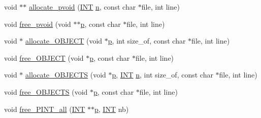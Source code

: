 \begin{DoxyCompactItemize}
void $\ast$$\ast$ \mbox{\hyperlink{_g_a_l_o_i_s_2memory_8_c_a0b121faaf69ba87cd8656f41c9ae8cc0}{allocate\+\_\+pvoid}} (\mbox{\hyperlink{galois_8h_a09fddde158a3a20bd2dcadb609de11dc}{I\+NT}} \mbox{\hyperlink{simeon_8_c_a7f2cd26777ce0ff3fdaf8d02aacbddfb}{n}}, const char $\ast$file, int line)
\item 
void \mbox{\hyperlink{_g_a_l_o_i_s_2memory_8_c_a7b1d5340753be7cd30403b104044ffe8}{free\+\_\+pvoid}} (void $\ast$$\ast$\mbox{\hyperlink{alphabet2_8_c_a533391314665d6bf1b5575e9a9cd8552}{p}}, const char $\ast$file, int line)
\item 
void $\ast$ \mbox{\hyperlink{_g_a_l_o_i_s_2memory_8_c_a5efd352b66c5bd5cd9eb5d233b803e15}{allocate\+\_\+\+O\+B\+J\+E\+CT}} (void $\ast$\mbox{\hyperlink{alphabet2_8_c_a533391314665d6bf1b5575e9a9cd8552}{p}}, int size\+\_\+of, const char $\ast$file, int line)
\item 
void \mbox{\hyperlink{_g_a_l_o_i_s_2memory_8_c_a94d06da57238d064c9424eed8078741a}{free\+\_\+\+O\+B\+J\+E\+CT}} (void $\ast$\mbox{\hyperlink{alphabet2_8_c_a533391314665d6bf1b5575e9a9cd8552}{p}}, const char $\ast$file, int line)
\item 
void $\ast$ \mbox{\hyperlink{_g_a_l_o_i_s_2memory_8_c_af5314236ae007b44933b88f9214b031c}{allocate\+\_\+\+O\+B\+J\+E\+C\+TS}} (void $\ast$\mbox{\hyperlink{alphabet2_8_c_a533391314665d6bf1b5575e9a9cd8552}{p}}, \mbox{\hyperlink{galois_8h_a09fddde158a3a20bd2dcadb609de11dc}{I\+NT}} \mbox{\hyperlink{simeon_8_c_a7f2cd26777ce0ff3fdaf8d02aacbddfb}{n}}, int size\+\_\+of, const char $\ast$file, int line)
\item 
void \mbox{\hyperlink{_g_a_l_o_i_s_2memory_8_c_a30bdb071eeac5e5b5719cf30d9596f8d}{free\+\_\+\+O\+B\+J\+E\+C\+TS}} (void $\ast$\mbox{\hyperlink{alphabet2_8_c_a533391314665d6bf1b5575e9a9cd8552}{p}}, const char $\ast$file, int line)
\item 
void \mbox{\hyperlink{_g_a_l_o_i_s_2memory_8_c_a8c74577588c4d669d8858633dd2f0b98}{free\+\_\+\+P\+I\+N\+T\+\_\+all}} (\mbox{\hyperlink{galois_8h_a09fddde158a3a20bd2dcadb609de11dc}{I\+NT}} $\ast$$\ast$\mbox{\hyperlink{alphabet2_8_c_a533391314665d6bf1b5575e9a9cd8552}{p}}, \mbox{\hyperlink{galois_8h_a09fddde158a3a20bd2dcadb609de11dc}{I\+NT}} nb)
\end{DoxyCompactItemize}
